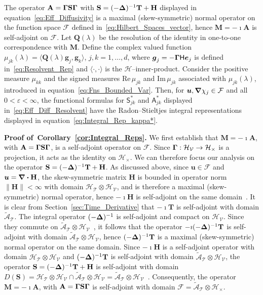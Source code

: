 \documentclass[leqno,onefignum,onetabnum]{siamltex1213}
\newcommand{\secref}[1]{Section~\ref{#1}}
\newcommand{\corref}[1]{Corollary~\ref{#1}}
\newcommand\Real{\mbox{Re}\,} %
\newcommand\Imag{\mbox{Im}\,} %
\newcommand{\Mb}{\mathbf{M}}
\newcommand{\Tb}{\mathbf{T}}
\newcommand{\Hb}{\mathbf{H}}
\newcommand{\Sb}{\mathbf{S}}
\newcommand{\Ab}{\mathbf{A}}
\newcommand{\Qb}{\mathbf{Q}}
\newcommand{\Tc}{\mathcal{T}}
\newcommand{\Vc}{\mathcal{V}}
\newcommand{\Hc}{\mathcal{H}}
\newcommand{\Fc}{\mathcal{F}}
\newcommand{\Ac}{\mathcal{A}}
\newcommand{\Hm}{\mathsf{H}}
\newcommand{\Sm}{\mathsf{S}}
\newcommand{\Am}{\mathsf{A}}
\newcommand\bDelta{\mbox{\boldmath${\Delta}$}}
\newcommand\bGamma{\mbox{\boldmath${\Gamma}$}}
\newcommand\bnabla{\mbox{\boldmath${\nabla}$}}
\providecommand\bcdot{\boldsymbol{\cdot}}
\newcommand{\vecg}{\boldsymbol{g}}
\newcommand{\vecu}{\boldsymbol{u}}
\newcommand{\vece}{\boldsymbol{e}}
\begin{document}
\begin{corollary}\label{cor:Integral_Reps}
  The operator $\Ab=\bGamma\Sb\bGamma$ with
  $\Sb=(-\bDelta)^{-1}\Tb+\Hb$ displayed in
  equation~\eqref{eq:Eff_Diffusivity} is a maximal (skew-symmetric)
  normal operator on the function space $\Fc$ defined
  in~\eqref{eq:Hilbert_Spaces_vector}, hence $\Mb=-\imath\Ab$ is
  self-adjoint on $\Fc$. Let $\Qb(\lambda)$ be the resolution of the
  identity in one-to-one correspondence with $\Mb$. Define the complex
  valued function $\mu_{jk}(\lambda)=\langle\Qb(\lambda)\vecg_j,\vecg_k\rangle$, $j,k=1,\ldots,d$,
  where $ \vecg_j=-\bGamma\Hm\vece_j$ is defined
  in~\eqref{eq:Resolvent_Rep} and $\langle\cdot,\cdot\rangle$ is the
  $\Hc$--inner-product. Consider the positive measure $\mu_{kk}$ and the
  signed measures $\Real\mu_{jk}$ and $\Imag\mu_{jk}$ associated with
  $\mu_{jk}(\lambda)$, introduced in
  equation~\eqref{eq:Fns_Bounded_Var}. Then, for
  $\vecu,\bnabla\chi_j\in\Fc$ and all $0<\varepsilon<\infty$, the functional formulas for
  $\Sm^*_{jk}$ and $\Am^*_{jk}$ displayed
  in~\eqref{eq:Eff_Diff_Resolvent} have the Radon--Stieltjes integral
  representations displayed in
  equation~\eqref{eq:Integral_Rep_kappa*}.     
% 
\end{corollary}
%


\textbf{Proof of~\corref{cor:Integral_Reps}.}\hspace{1ex}
%
We first establish that $\Mb=-\imath \Ab$, with $\Ab=\bGamma\Sb\bGamma$, is
a self-adjoint operator on $\Fc$. Since $\bGamma:\Hc_{\Vc}\to\Hc_\times$ is a
projection, it acts as the identity on $\Hc_\times$. We can therefore focus
our analysis on the operator $\Sb=(-\bDelta)^{-1}\Tb+\Hb$. As
discussed above, since $\vecu\in\Fc$ and $\vecu=\bnabla\bcdot\Hb$, the
skew-symmetric matrix $\Hb$ is bounded in operator norm $\|\Hb\|<\infty$ with
domain $\Hc_{\Tc}\otimes\Hc_{\Vc}$, and is therefore a maximal
(skew-symmetric) normal operator, hence $-\imath\Hb$ is self-adjoint on the same
domain~\cite{Stone:64}. It is clear from \secref{sec:Time_Derivative}
that $-\imath\Tb$ is self-adjoint with domain $\tilde{\Ac}_{\Tc}$. The
integral operator $(-\bDelta)^{-1}$ is self-adjoint and compact on
$\Hc_{\Vc}$. Since they commute on
$\tilde{\Ac}_{\Tc}\otimes\Hc_{\Vc}$~\cite{Folland:99:RealAnalysis}, it
follows that the operator $-\imath(-\bDelta)^{-1}\Tb$ is self-adjoint with
domain $\tilde{\Ac}_{\Tc}\otimes\Hc_{\Vc}$, hence $(-\bDelta)^{-1}\Tb$ is a
maximal (skew-symmetric) normal operator on the same domain.
Since $-\imath\Hb$ is a self-adjoint operator with
domain $\Hc_{\Tc}\otimes\Hc_{\Vc}$ and $(-\bDelta)^{-1}\Tb$ is self-adjoint with
domain $\tilde{\Ac}_{\Tc}\otimes\Hc_{\Vc}$, the operator
$\Sb=(-\bDelta)^{-1}\Tb+\Hb$ is self-adjoint with domain 
$D(\Sb)=\Hc_{\Tc}\otimes\Hc_{\Vc}\cap\tilde{\Ac}_{\Tc}\otimes\Hc_{\Vc}=\tilde{\Ac}_{\Tc}\otimes\Hc_{\Vc}$~\cite{Stone:64}. Consequently,
the operator $\Mb=-\imath\Ab$, with $\Ab=\bGamma\Sb\bGamma$ is self-adjoint
with domain $\Fc=\tilde{\Ac}_{\Tc}\otimes\Hc_\times$.
\end{document}
